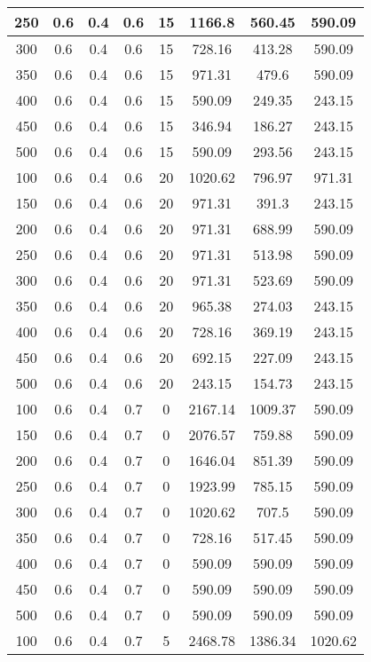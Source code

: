 \documentclass[a4paper, 12pt]{extreport}
\begin{document}
\begin{itemize}
\begin{longtable}{|c|c|c|c|c|c|c|c|}
			250 & 0.6 & 0.4 & 0.6 & 15 & 1166.8 & 560.45 & 590.09 \\\hline
			300 & 0.6 & 0.4 & 0.6 & 15 & 728.16 & 413.28 & 590.09 \\\hline
			350 & 0.6 & 0.4 & 0.6 & 15 & 971.31 & 479.6 & 590.09 \\\hline
			400 & 0.6 & 0.4 & 0.6 & 15 & 590.09 & 249.35 & 243.15 \\\hline
			450 & 0.6 & 0.4 & 0.6 & 15 & 346.94 & 186.27 & 243.15 \\\hline
			500 & 0.6 & 0.4 & 0.6 & 15 & 590.09 & 293.56 & 243.15 \\\hline
			100 & 0.6 & 0.4 & 0.6 & 20 & 1020.62 & 796.97 & 971.31 \\\hline
			150 & 0.6 & 0.4 & 0.6 & 20 & 971.31 & 391.3 & 243.15 \\\hline
			200 & 0.6 & 0.4 & 0.6 & 20 & 971.31 & 688.99 & 590.09 \\\hline
			250 & 0.6 & 0.4 & 0.6 & 20 & 971.31 & 513.98 & 590.09 \\\hline
			300 & 0.6 & 0.4 & 0.6 & 20 & 971.31 & 523.69 & 590.09 \\\hline
			350 & 0.6 & 0.4 & 0.6 & 20 & 965.38 & 274.03 & 243.15 \\\hline
			400 & 0.6 & 0.4 & 0.6 & 20 & 728.16 & 369.19 & 243.15 \\\hline
			450 & 0.6 & 0.4 & 0.6 & 20 & 692.15 & 227.09 & 243.15 \\\hline
			500 & 0.6 & 0.4 & 0.6 & 20 & 243.15 & 154.73 & 243.15 \\\hline
			100 & 0.6 & 0.4 & 0.7 & 0 & 2167.14 & 1009.37 & 590.09 \\\hline
			150 & 0.6 & 0.4 & 0.7 & 0 & 2076.57 & 759.88 & 590.09 \\\hline
			200 & 0.6 & 0.4 & 0.7 & 0 & 1646.04 & 851.39 & 590.09 \\\hline
			250 & 0.6 & 0.4 & 0.7 & 0 & 1923.99 & 785.15 & 590.09 \\\hline
			300 & 0.6 & 0.4 & 0.7 & 0 & 1020.62 & 707.5 & 590.09 \\\hline
			350 & 0.6 & 0.4 & 0.7 & 0 & 728.16 & 517.45 & 590.09 \\\hline
			400 & 0.6 & 0.4 & 0.7 & 0 & 590.09 & 590.09 & 590.09 \\\hline
			450 & 0.6 & 0.4 & 0.7 & 0 & 590.09 & 590.09 & 590.09 \\\hline
			500 & 0.6 & 0.4 & 0.7 & 0 & 590.09 & 590.09 & 590.09 \\\hline
			100 & 0.6 & 0.4 & 0.7 & 5 & 2468.78 & 1386.34 & 1020.62 \\\hline

\end{longtable}
\end{itemize}
\end{document}

